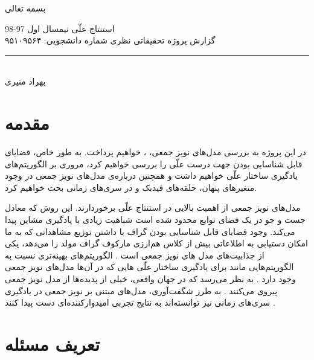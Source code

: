 \documentclass[a4paper,12pt]{article}
\begin{document}
\begin{center}
بسمه تعالی
\end{center}
\begin{large}
استنتاج علّی
\hspace{10.3cm}
نیمسال اول 97-98
\\
گزارش پروژه تحقیقاتی نظری\hspace{8cm}  شماره دانشجویی:  ۹۵۱۰۹۵۶۴
\end{large}

\noindent\rule{\textwidth}{1pt}
\begin{center}
\begin{large}
\textbf{}\\
\vspace{0.5cm}
بهراد منیری
\end{large}
\end{center}


\section{مقدمه}
در این پروژه به بررسی مدل‌های نویز جمعی،
،
خواهیم پرداخت. به طور خاص، قضایای قابل شناسایی بودن جهت درست علّی  را بررسی خواهیم کرد، مروری بر الگوریتم‌های یادگیری  ساختار‌ علّی خواهیم داشت و همچنین درباره‌ی مدل‌های نویز جمعی در وجود متغیر‌های پنهان، حلقه‌‌های فیدبک و در سری‌های زمانی بحث خواهیم کرد. 

مدل‌های نویز جمعی از اهمیت بالایی در استنتاج علّی برخوردارند.  این روش که معادل جست‌ و جو در یک فضای توابع محدود شده است شباهیت زیادی با یادگیری مشاین پیدا می‌کند. وجود  قضایای قابل شناسایی بودن گراف  با داشتن توزیع مشاهداتی که به ما امکان دستیابی به اطلاعاتی بیش از کلاس هم‌ارزی مارکوف گراف مولد را می‌دهد، یکی از جذابیت‌های مدل های نویز جمعی است
\cite{hoyer}.
  الگوریتم‌های بهینه‌تری نسبت به الگوریتم‌هایی مانند 
برای یادگیری ساختار علّی 
هایی که در آن‌ها مدل‌های نویز جمعی وجود دارد 
\cite{continous}.
به نظر می‌رسد که در جهان واقعی، خیلی از پدیده‌ها از مدل‌ نویز جمعی پیروی می‌کنند
\cite{continous, postnonlinear}.
 به طرز شگفت‌آوری، مدل‌های مبتنی بر نویز جمعی در یادگیری سری‌های زمانی نیز توانسته‌اند به نتایج تجربی امیدوارکننده‌ای دست پیدا کنند
\cite{time}.


\section{تعریف مسئله}
\end{document}

